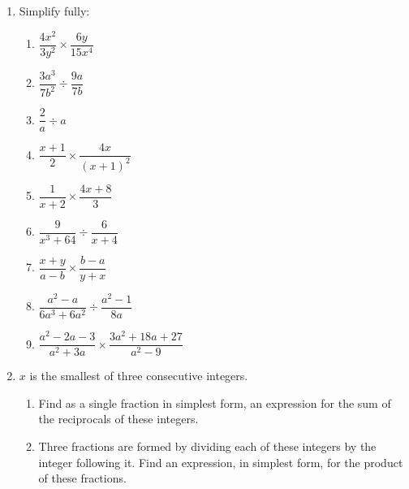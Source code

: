 \documentclass[11pt,a4paper,twoside]{article}
\begin{document}
\begin{enumerate}
\begin{enumerate}
        \end{enumerate}
\item   Simplify fully:
        \begin{multicols}{2}
        \begin{enumerate}
        \item	$\dfrac{4x^2}{3y^2} \times \dfrac{6y}{15x^4}$
        \item	$\dfrac{3a^3}{7b^2} \div \dfrac{9a}{7b}$
        \item	$\dfrac{2}{a} \div a$
        \item	$\dfrac{x + 1}{2} \times \dfrac{4x}{(x + 1)^2}$
        \item	$\dfrac{1}{x + 2} \times \dfrac{4x + 8}{3}$
        \item	$\dfrac{9}{x^3 + 64} \div \dfrac{6}{x + 4}$
        \item	$\dfrac{x + y}{a - b} \times \dfrac{b - a}{y + x}$
        \item	$\dfrac{a^2 - a}{6a^3 + 6a^2} \div \dfrac{a^2 - 1}{8a}$
        \item	$\dfrac{a^2 - 2a - 3}{a^2 + 3a} \times \dfrac{3a^2 + 18a + 27}{a^2 - 9}$
        \end{enumerate}
        \end{multicols}
\item   $x$ is the smallest of three consecutive integers.
        \begin{enumerate}
        \item   Find as a single fraction in simplest form, an expression for the sum of the reciprocals of these integers.
        \item   Three fractions are formed by dividing each of these integers by the integer following it. Find an expression, in simplest form, for the product of these fractions.

\end{enumerate}
\end{enumerate}
\end{document}
